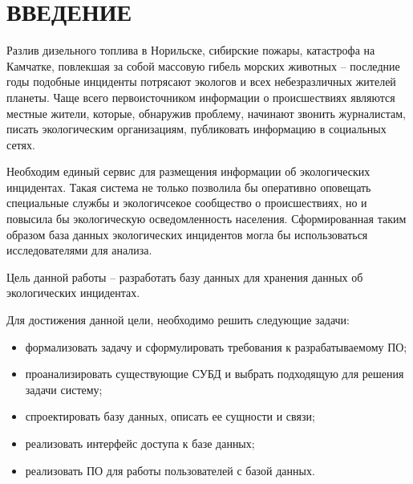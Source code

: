 \chapter*{ВВЕДЕНИЕ}

Разлив дизельного топлива в Норильске\cite{diesel}, сибирские пожары\cite{fires}, катастрофа на Камчатке, повлекшая за собой массовую гибель морских животных\cite{kamchatka} -- последние годы подобные инциденты потрясают экологов и всех небезразличных жителей планеты. Чаще всего первоисточником информации о происшествиях являются местные жители, которые, обнаружив проблему, начинают звонить журналистам, писать экологическим организациям, публиковать информацию в социальных сетях\cite{interview}.  

Необходим единый сервис для размещения информации об экологических инцидентах. Такая система не только позволила бы оперативно оповещать специальные службы и экологичсекое сообщество о происшествиях, но и повысила бы экологическую осведомленность населения. Сформированная таким образом база данных экологических инцидентов могла бы использоваться исследователями для анализа.  

Цель данной работы -- разработать базу данных для хранения данных об экологических инцидентах.

Для достижения данной цели, необходимо решить следующие задачи:
\begin{itemize}
	\item формализовать задачу и сформулировать требования к разрабатываемому ПО;
	\item проанализировать существующие СУБД и выбрать подходящую для решения задачи систему;
	\item спроектировать базу данных, описать ее сущности и связи;
	\item реализовать интерфейс доступа к базе данных;
	\item реализовать ПО для работы пользователей с базой данных.
\end{itemize}  